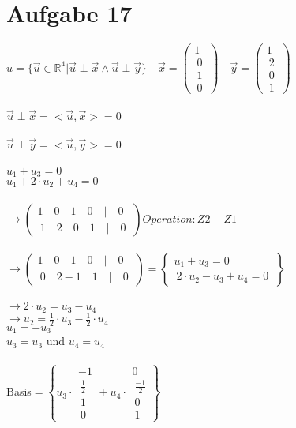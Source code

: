 \documentclass[12pt,a4paper]{article}
\begin{document}
\section*{Aufgabe 17}
$u=\{\vec{u}\in \mathbb{R}^4 | \vec{u}\perp \vec{x} \wedge \vec{u}\perp \vec{y}\} \quad \vec{x}=\left( \begin{array}{c} 1 \\\ 0 \\\ 1 \\\ 0 \ \end{array}\right)\quad \vec{y}=\left( \begin{array}{c} 1 \\\ 2 \\\ 0 \\\ 1 \ \end{array}\right)$\\
\\
$\vec{u}\perp \vec{x} =<\vec{u},\vec{x}> = 0 $\\
\\
$\vec{u}\perp \vec{y} =<\vec{u},\vec{y}> = 0 $\\
\\
$u_1+u_3=0$\\
$u_1+2\cdot u_2+u_4=0$\\
\\
$\rightarrow \left( \begin{array}{c} 1\quad 0\quad 1\quad 0\quad|\quad0 \\\ 1\quad 2\quad 0\quad 1\quad|\quad0 \ \end{array}\right) Operation:Z2-Z1$\\
\\
$\rightarrow \left( \begin{array}{c} 1\quad 0\quad 1\quad 0\quad|\quad0 \\\ 0\quad 2-1\quad 1\quad|\quad0 \ \end{array}\right)=\left\lbrace \begin{array}{c}u_1  +u_3  =0 \\\   2\cdot u_2 -u_3+u_4=0 \ \end{array}\right\rbrace$\\
\\
$\rightarrow 2\cdot u_2 = u_3-u_4 $\\
$\rightarrow u_2=\frac{1}{2}\cdot u_3-\frac{1}{2}\cdot u_4$\\
$u_1=-u_3$\\
$u_3=u_3$ und $u_4=u_4$\\
\\
Basis$=\left\lbrace u_3 \cdot \begin{array}{c} -1\\\ \frac{1}{2} \\\ 1 \\\ 0 \ \end{array}+u_4 \cdot  \begin{array}{c} 0\\\ \frac{-1}{2} \\\ 0 \\\ 1 \ \end{array}    \right\rbrace$\\
\\
\end{document}
